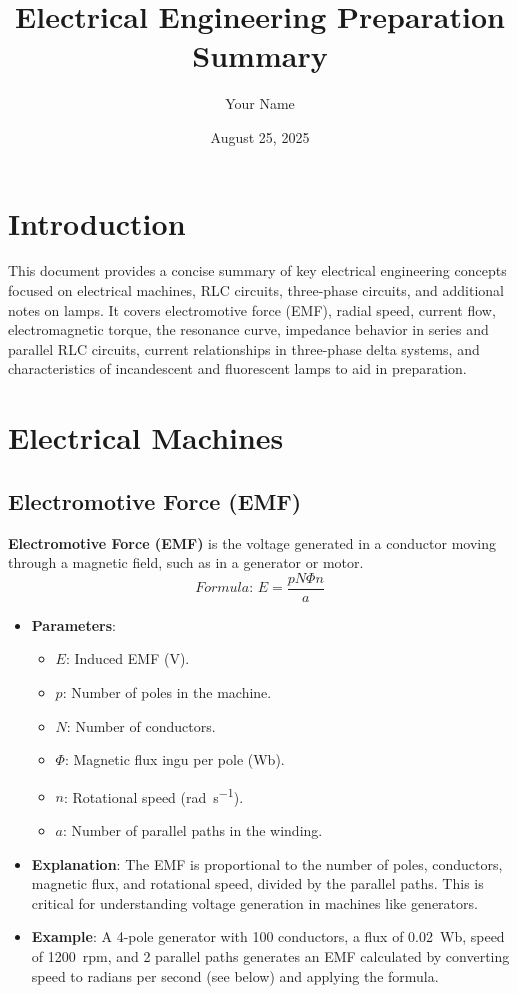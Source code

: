 \documentclass[12pt]{article}
\newcommand{\concept}[1]{\textbf{#1}}
\newcommand{\formula}[1]{\textit{Formula: }#1}
\begin{document}
\title{Electrical Engineering Preparation Summary}
\author{Your Name}
\date{August 25, 2025}
\maketitle

\tableofcontents
\newpage

\section{Introduction}
This document provides a concise summary of key electrical engineering concepts focused on electrical machines, RLC circuits, three-phase circuits, and additional notes on lamps. It covers electromotive force (EMF), radial speed, current flow, electromagnetic torque, the resonance curve, impedance behavior in series and parallel RLC circuits, current relationships in three-phase delta systems, and characteristics of incandescent and fluorescent lamps to aid in preparation.

\section{Electrical Machines}
\subsection{Electromotive Force (EMF)}
\concept{Electromotive Force (EMF)} is the voltage generated in a conductor moving through a magnetic field, such as in a generator or motor.
\[
\formula{E = \frac{p N \Phi n}{a}}
\]
\begin{itemize}
    \item \textbf{Parameters}:
        \begin{itemize}
            \item \(E\): Induced EMF (\si{\volt}).
            \item \(p\): Number of poles in the machine.
            \item \(N\): Number of conductors.
            \item \(\Phi\): Magnetic flux ingu per pole (\si{\weber}).
            \item \(n\): Rotational speed (\si{\radian\per\second}).
            \item \(a\): Number of parallel paths in the winding.
        \end{itemize}
    \item \textbf{Explanation}: The EMF is proportional to the number of poles, conductors, magnetic flux, and rotational speed, divided by the parallel paths. This is critical for understanding voltage generation in machines like generators.
    \item \textbf{Example}: A 4-pole generator with 100 conductors, a flux of \SI{0.02}{\weber}, speed of \SI{1200}{rpm}, and 2 parallel paths generates an EMF calculated by converting speed to radians per second (see below) and applying the formula.
\end{itemize}
\end{document}
